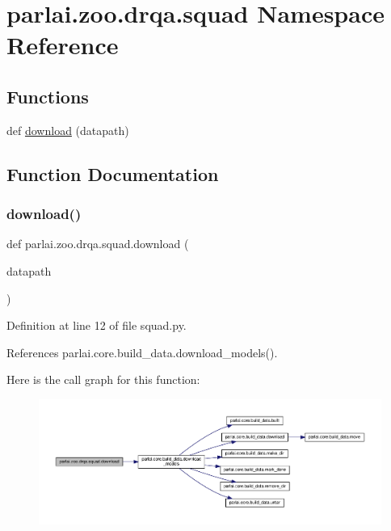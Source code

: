 \hypertarget{namespaceparlai_1_1zoo_1_1drqa_1_1squad}{}\section{parlai.\+zoo.\+drqa.\+squad Namespace Reference}
\label{namespaceparlai_1_1zoo_1_1drqa_1_1squad}
\subsection*{Functions}
\begin{DoxyCompactItemize}
\item 
def \hyperlink{namespaceparlai_1_1zoo_1_1drqa_1_1squad_a214382c0fb2cdf9dc92997e884e6c50f}{download} (datapath)
\end{DoxyCompactItemize}


\subsection{Function Documentation}
\mbox{\label{namespaceparlai_1_1zoo_1_1drqa_1_1squad_a214382c0fb2cdf9dc92997e884e6c50f}} 
\subsubsection{\texorpdfstring{download()}{download()}}
{\footnotesize\ttfamily def parlai.\+zoo.\+drqa.\+squad.\+download (\begin{DoxyParamCaption}\item[{}]{datapath }\end{DoxyParamCaption})}



Definition at line 12 of file squad.\+py.



References parlai.\+core.\+build\+\_\+data.\+download\+\_\+models().

Here is the call graph for this function\+:
\nopagebreak
\begin{figure}[H]
\begin{center}
\leavevmode
\includegraphics[width=350pt]{namespaceparlai_1_1zoo_1_1drqa_1_1squad_a214382c0fb2cdf9dc92997e884e6c50f_cgraph}
\end{center}
\end{figure}
